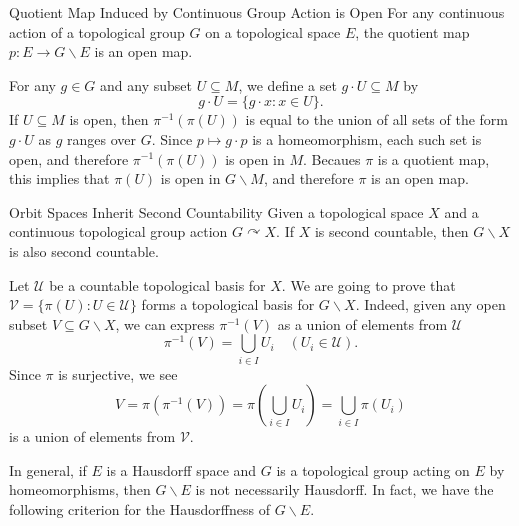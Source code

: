 \documentclass{report}
\def\acts{\curvearrowright}
\begin{document}
\begin{proposition}{Quotient Map Induced by Continuous Group Action is Open}{}
	For any continuous action of a topological group $G$ on a topological space $E$, the quotient map $p: E \rightarrow G\backslash E$ is an open map.
\end{proposition}

\begin{prf}
	For any $g \in G$ and any subset $U \subseteq M$, we define a set $g \cdot U \subseteq M$ by
	$$
		g \cdot U=\{g \cdot x: x \in U\} .
	$$
	If $U \subseteq M$ is open, then $\pi^{-1}(\pi(U))$ is equal to the union of all sets of the form $g \cdot U$ as $g$ ranges over $G$. Since $p \mapsto g \cdot p$ is a homeomorphism, each such set is open, and therefore $\pi^{-1}(\pi(U))$ is open in $M$. Becaues $\pi$ is a quotient map, this implies that $\pi(U)$ is open in $G\backslash M$, and therefore $\pi$ is an open map.
\end{prf}

\begin{lemma}{Orbit Spaces Inherit Second Countability}{}
	Given a topological space $X$ and a continuous topological group action $G \acts X$. If $X$ is second countable, then $G\backslash X$ is also second countable.
\end{lemma}
\begin{prf}
	Let $\mathcal{U}$ be a countable topological basis for $X$. We are going to prove that $\mathcal{V}=\{\pi(U): U \in \mathcal{U}\}$ forms a topological basis for $G \backslash X$. Indeed, given any open subset $V \subseteq G \backslash X$, we can express $\pi^{-1}(V)$ as a union of elements from $\mathcal{U}$
	\[
		\pi^{-1}(V)=\bigcup_{i \in I} U_i\quad (U_i \in \mathcal{U}).
	\]
	Since $\pi$ is surjective, we see
	\[
		V=\pi\left(\pi^{-1}(V)\right)=\pi\left(\bigcup_{i \in I} U_i\right)=\bigcup_{i \in I}\pi\left(U_i\right)
	\]
	is a union of elements from $\mathcal{V}$.
\end{prf}

In general, if $E$ is a Hausdorff space and $G$ is a topological group acting on $E$ by homeomorphisms, then $G\backslash E$ is not necessarily Hausdorff. In fact, we have the following criterion for the Hausdorffness of $G\backslash E$.
\end{document}
